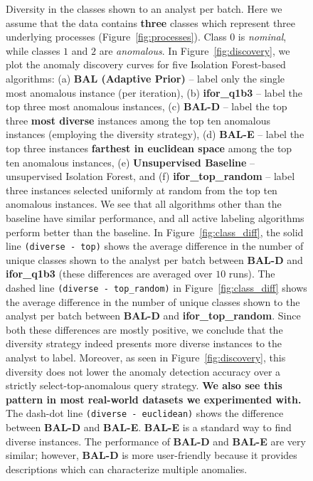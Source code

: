 \documentclass{article} %
\begin{document}
\begin{figure}
	\caption{Diversity in the classes shown to an analyst per batch. Here we assume that the data contains \textbf{three} classes which represent three underlying processes (Figure~\ref{fig:processes}). Class $0$ is \emph{nominal}, while classes $1$ and $2$ are \emph{anomalous}. In Figure~\ref{fig:discovery}, we plot the anomaly discovery curves for five Isolation Forest-based algorithms: (a) \textbf{BAL (Adaptive Prior)} -- label only the single most anomalous instance (per iteration), (b) \textbf{ifor\_q1b3} -- label the top three most anomalous instances, (c) \textbf{BAL-D} -- label the top three \textbf{most diverse} instances among the top ten anomalous instances (employing the diversity strategy), (d) \textbf{BAL-E} -- label the top three instances \textbf{farthest in euclidean space} among the top ten anomalous instances, (e) \textbf{Unsupervised Baseline} -- unsupervised Isolation Forest, and (f) \textbf{ifor\_top\_random} -- label three instances selected uniformly at random from the top ten anomalous instances. We see that all algorithms other than the baseline have similar performance, and all active labeling algorithms perform better than the baseline. In Figure~\ref{fig:class_diff}, the solid line \texttt{(diverse - top)} shows the average difference in the number of unique classes shown to the analyst per batch between \textbf{BAL-D} and \textbf{ifor\_q1b3} (these differences are averaged over $10$ runs). The dashed line \texttt{(diverse - top\_random)} in Figure~\ref{fig:class_diff} shows the average difference in the number of unique classes shown to the analyst per batch between \textbf{BAL-D} and \textbf{ifor\_top\_random}. Since both these differences are mostly positive, we conclude that the diversity strategy indeed presents more diverse instances to the analyst to label. Moreover, as seen in Figure~\ref{fig:discovery}, this diversity does not lower the anomaly detection accuracy over a strictly select-top-anomalous query strategy. \textbf{We also see this pattern in most real-world datasets we experimented with.} The dash-dot line \texttt{(diverse - euclidean)} shows the difference between \textbf{BAL-D} and \textbf{BAL-E}. \textbf{BAL-E} is a standard way to find diverse instances. The performance of \textbf{BAL-D} and \textbf{BAL-E} are very similar; however, \textbf{BAL-D} is more user-friendly because it provides descriptions which can characterize multiple anomalies.} \label{fig:diverse_effect}
\end{figure}
\end{document}
